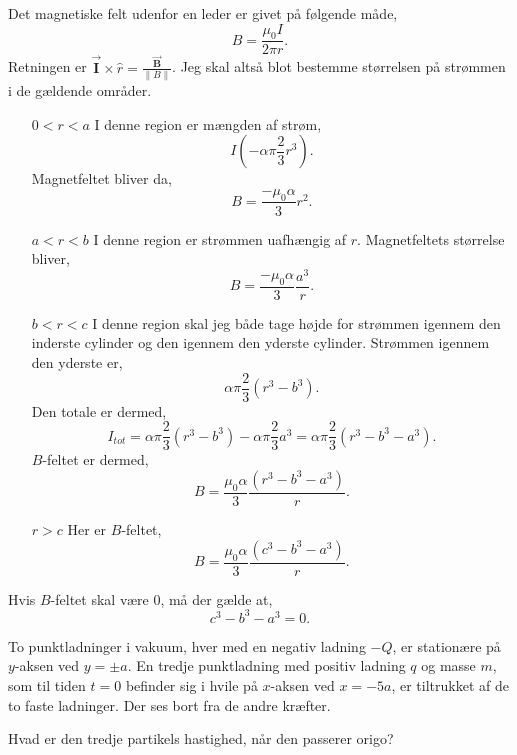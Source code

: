 \begin{solution}
Det magnetiske felt udenfor en leder er givet på følgende måde,
\[
B = \frac{\mu_0 I}{2\pi r}
.\] 
Retningen er $\vec{\mathbf{I}} \times \hat{r} = \frac{\vec{\mathbf{B}} }{\|B\|}$. Jeg skal altså blot bestemme størrelsen på strømmen i de gældende områder.
\begin{itemize}
	\item[$0<r<a$]
		I denne region er mængden af strøm,
		 \[
		I\left( -\alpha\pi\frac{2}{3}r^3 \right) 
		.\] 
		Magnetfeltet bliver da,
		\[
		B = \frac{-\mu_0 \alpha}{3} r^2
		.\]
	\item[$a<r<b$]
		I denne region er strømmen uafhængig af $r$. Magnetfeltets størrelse bliver,
		\[
		B = \frac{-\mu_0 \alpha}{3} \frac{a^3}{r}
		.\] 
	\item[$b<r<c$]
		I denne region skal jeg både tage højde for strømmen igennem den inderste cylinder og den igennem den yderste cylinder. Strømmen igennem den yderste er,
		 \[
		\alpha\pi \frac{2}{3}\left( r^{3} - b^3 \right) 
		.\] 
		Den totale er dermed,
		\[
		I_{tot} = \alpha\pi \frac{2}{3}\left( r^{3} - b^3 \right)  -\alpha\pi \frac{2}{3} a^3 = \alpha \pi \frac{2}{3}\left( r^3-b^3-a^3 \right)  
		.\] 
		$B$-feltet er dermed,
		 \[
		B = \frac{\mu_0\alpha }{3}\frac{\left( r^3-b^3-a^3 \right) }{r}
		.\] 
	\item[$r>c$]
		Her er $B$-feltet,
		\[
		B = \frac{\mu_0\alpha }{3}\frac{\left( c^3-b^3-a^3 \right) }{r}
		.\]
\end{itemize}
Hvis $B$-feltet skal være $0$, må der gælde at,
 \[
c ^3 - b^3 - a^3 = 0
.\] 
\end{solution}
\begin{exercise}[Opgave 3]
To punktladninger i vakuum, hver med en negativ ladning $-Q$, er stationære på $y$-aksen ved $y = \pm a$. En tredje punktladning med positiv ladning $q$ og masse $m$, som til tiden $t=0$ befinder sig i hvile på $x$-aksen ved $x=-5a$, er tiltrukket af de to faste ladninger. Der ses bort fra de andre kræfter.
\end{exercise}
\begin{figure}[ht]
    \centering
    \label{fig:opgave3}
\end{figure}
\begin{subexercise}[a]
Hvad er den tredje partikels hastighed, når den passerer origo?
\end{subexercise}

